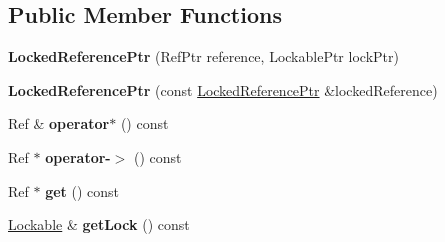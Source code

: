 \subsection*{Public Member Functions}
\begin{DoxyCompactItemize}
\item 
\hypertarget{classcore_1_1threading_1_1_locked_reference_ptr_aa7a674c66d4a125710eec4acd0d998c7}{{\bfseries Locked\-Reference\-Ptr} (Ref\-Ptr reference, Lockable\-Ptr lock\-Ptr)}\label{classcore_1_1threading_1_1_locked_reference_ptr_aa7a674c66d4a125710eec4acd0d998c7}

\item 
\hypertarget{classcore_1_1threading_1_1_locked_reference_ptr_a71ceeedcef9b13c956d91b1e320a7e8e}{{\bfseries Locked\-Reference\-Ptr} (const \hyperlink{classcore_1_1threading_1_1_locked_reference_ptr}{Locked\-Reference\-Ptr} \&locked\-Reference)}\label{classcore_1_1threading_1_1_locked_reference_ptr_a71ceeedcef9b13c956d91b1e320a7e8e}

\item 
\hypertarget{classcore_1_1threading_1_1_locked_reference_ptr_aa0520cde97032ae3e3ee74e31bb96824}{Ref \& {\bfseries operator$\ast$} () const }\label{classcore_1_1threading_1_1_locked_reference_ptr_aa0520cde97032ae3e3ee74e31bb96824}

\item 
\hypertarget{classcore_1_1threading_1_1_locked_reference_ptr_ac381ba7ef09da7c609ef451c449f1d62}{Ref $\ast$ {\bfseries operator-\/$>$} () const }\label{classcore_1_1threading_1_1_locked_reference_ptr_ac381ba7ef09da7c609ef451c449f1d62}

\item 
\hypertarget{classcore_1_1threading_1_1_locked_reference_ptr_a55f88de8320fa2abce4561761e51422f}{Ref $\ast$ {\bfseries get} () const }\label{classcore_1_1threading_1_1_locked_reference_ptr_a55f88de8320fa2abce4561761e51422f}

\item 
\hypertarget{classcore_1_1threading_1_1_locked_reference_ptr_aa37d16beb8f2817d237a122ee0148dbd}{\hyperlink{classcore_1_1threading_1_1_lockable}{Lockable} \& {\bfseries get\-Lock} () const }\label{classcore_1_1threading_1_1_locked_reference_ptr_aa37d16beb8f2817d237a122ee0148dbd}

\end{DoxyCompactItemize}
